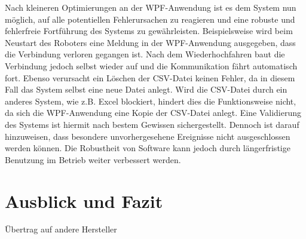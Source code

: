 \documentclass[ a4paper,
                oneside,
                toc=bibliography,
                toc=listof
                ]{scrbook}
\begin{document}
   	Nach kleineren Optimierungen an der WPF-Anwendung ist es dem System nun möglich, auf alle potentiellen Fehlerursachen zu reagieren und eine robuste und fehlerfreie Fortführung des Systems zu gewährleisten. Beispielsweise wird beim Neustart des Roboters eine Meldung in der WPF-Anwendung ausgegeben, dass die Verbindung verloren gegangen ist. Nach dem Wiederhochfahren baut die Verbindung jedoch selbst wieder auf und die Kommunikation fährt automatisch fort. Ebenso verursacht ein Löschen der CSV-Datei keinen Fehler, da in diesem Fall das System selbst eine neue Datei anlegt. Wird die CSV-Datei durch ein anderes System, wie z.B. Excel blockiert, hindert dies die Funktionsweise nicht, da sich die WPF-Anwendung eine Kopie der CSV-Datei anlegt. Eine Validierung des Systems ist hiermit nach bestem Gewissen sichergestellt. Dennoch ist darauf hinzuweisen, dass besondere unvorhergesehene Ereignisse nicht ausgeschlossen werden können. Die Robustheit von Software kann jedoch durch längerfristige Benutzung im Betrieb weiter verbessert werden. 

   	\chapter{Ausblick und Fazit}
   	Übertrag auf andere Hersteller
   	\backmatter
   	
   	
   	\cleardoublepage
   	\listoffigures
   	\cleardoublepage
   	\listoftables
   	\cleardoublepage
   	
   	\cleardoublepage
   	\printbibliography
   	
   
\end{document}
